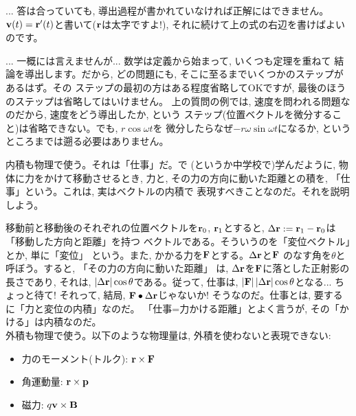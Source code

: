 \begin{faq}{\small{}
... 答は合っていても, 導出過程が書かれていなければ正解にはできません。
${\bf v}(t)={\bf r}'(t)$と書いて(${\bf r}$は太字ですよ!), 
それに続けて上の式の右辺を書けばよいのです。}\end{faq}
\hv

\begin{faq}{\small{}
... 一概には言えませんが... 数学は定義から始まって, いくつも定理を重ねて
結論を導出します。だから, どの問題にも, そこに至るまでいくつかのステップがあるはず。その
ステップの最初の方はある程度省略してOKですが, 最後のほうのステップは省略してはいけません。
上の質問の例では, 速度を問われる問題なのだから, 速度をどう導出したか, という
ステップ(位置ベクトルを微分すること)は省略できない。でも, $r\cos\omega t$を
微分したらなぜ$-r\omega\sin\omega t$になるか, というところまでは遡る必要はありません。}\end{faq}\hv


内積も物理で使う。それは「仕事」だ。で
(というか中学校で)学んだように, 物体に力をかけて移動させるとき, 力と, 
その力の方向に動いた距離との積を, 「仕事」という。これは, 実はベクトルの内積で
表現すべきことなのだ。それを説明しよう。

移動前と移動後のそれぞれの位置ベクトルを${\bf r}_0$, ${\bf r}_1$とすると, 
$\Delta{\bf r}:={\bf r}_1-{\bf r}_0$は「移動した方向と距離」を持つ
ベクトルである。そういうのを「変位ベクトル」とか, 単に「変位」
という。また, かかる力を${\bf F}$とする。$\Delta{\bf r}$と${\bf F}$
のなす角を$\theta$と呼ぼう。すると, 「その力の方向に動いた距離」
は, $\Delta{\bf r}$を${\bf F}$に落とした正射影の長さであり, 
それは, $|\Delta{\bf r}|\cos\theta$である。従って, 
仕事は, $|{\bf F}|\,|\Delta{\bf r}|\cos\theta$となる...
ちょっと待て! それって, 結局, ${\bf F}\bullet\Delta{\bf r}$じゃないか!
そうなのだ。仕事とは, 要するに「力と変位の内積」なのだ。
「仕事=力かける距離」とよく言うが, その「かける」は内積なのだ。\\

外積も物理で使う。以下のような物理量は, 外積を使わないと表現できない:
\begin{itemize}
\item 力のモーメント(トルク): ${\bf r}\times{\bf F}$
\item 角運動量: ${\bf r}\times{\bf p}$
\item 磁力: $q{\bf v}\times{\bf B}$
\end{itemize}

